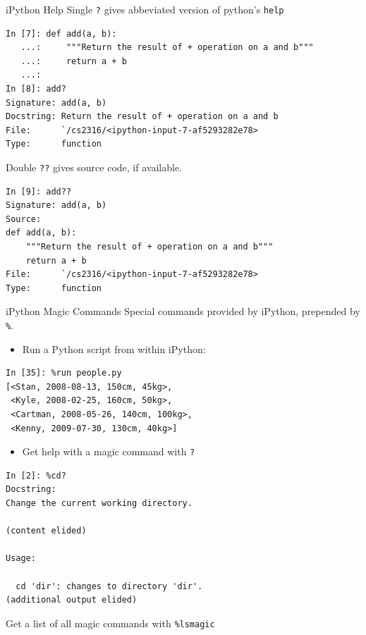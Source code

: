 \documentclass[smaller, aspectratio=1610]{beamer}
\begin{document}
\begin{frame}[label={sec:org10381ae},fragile]{iPython Help}
 Single \texttt{?} gives abbeviated version of python's \texttt{help}

\lstset{language=sh,label= ,caption= ,captionpos=b,numbers=none}
\begin{lstlisting}
In [7]: def add(a, b):
   ...:     """Return the result of + operation on a and b"""
   ...:     return a + b
   ...:
In [8]: add?
Signature: add(a, b)
Docstring: Return the result of + operation on a and b
File:      `/cs2316/<ipython-input-7-af5293282e78>
Type:      function
\end{lstlisting}

Double \texttt{??} gives source code, if available.

\lstset{language=sh,label= ,caption= ,captionpos=b,numbers=none}
\begin{lstlisting}
In [9]: add??
Signature: add(a, b)
Source:
def add(a, b):
    """Return the result of + operation on a and b"""
    return a + b
File:      `/cs2316/<ipython-input-7-af5293282e78>
Type:      function
\end{lstlisting}
\end{frame}

\begin{frame}[label={sec:org0d9c03b},fragile]{iPython Magic Commands}
 Special commands provided by iPython, prepended by \texttt{\%}.

\begin{itemize}
\item Run a Python script from within iPython:
\end{itemize}
\lstset{language=sh,label= ,caption= ,captionpos=b,numbers=none}
\begin{lstlisting}
In [35]: %run people.py
[<Stan, 2008-08-13, 150cm, 45kg>,
 <Kyle, 2008-02-25, 160cm, 50kg>,
 <Cartman, 2008-05-26, 140cm, 100kg>,
 <Kenny, 2009-07-30, 130cm, 40kg>]
\end{lstlisting}

\begin{itemize}
\item Get help with a magic command with \texttt{?}
\end{itemize}
\lstset{language=sh,label= ,caption= ,captionpos=b,numbers=none}
\begin{lstlisting}
In [2]: %cd?
Docstring:
Change the current working directory.

(content elided)

Usage:

  cd 'dir': changes to directory 'dir'.
(additional output elided)
\end{lstlisting}

Get a list of all magic commands with \texttt{\%lsmagic}
\end{frame}
\end{document}
